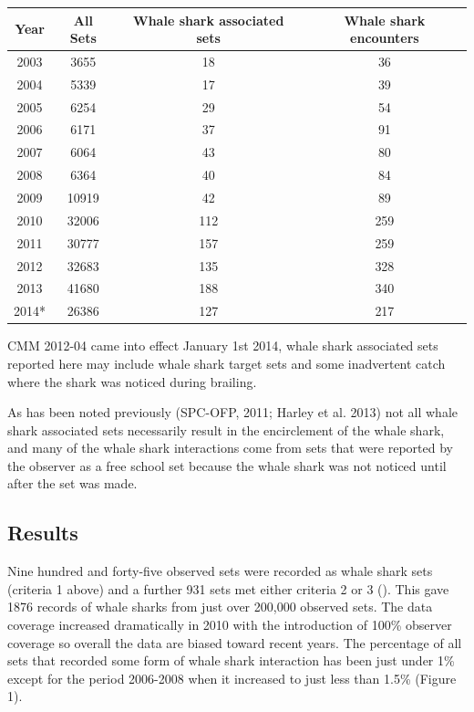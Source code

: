 \documentclass[12pt]{SCreport}
\begin{document}
\begin{table}[!h]
\label{tbl:whalesharktable1}
\begin{center}
\begin{tabular}{c|c|c|c}
Year & All Sets & Whale shark associated sets & Whale shark encounters\\
\hline
\hline
2003&	3655&	18&	36\\
2004&	5339&	17&	39\\
2005&	6254&	29&	54\\
2006&	6171&	37&	91\\
2007&	6064&	43&	80\\
2008&	6364&	40&	84\\
2009&	10919&	42&	89\\
2010&	32006&	112&	259\\
2011&	30777&	157&	259\\
2012&	32683&	135&	328\\
2013&	41680&	188&	340\\
2014*&	26386&	127&	217\\
\hline
\end{tabular}
\end{center}
\end{table}

CMM 2012-04 came into effect January 1st 2014, whale shark associated sets reported here may include whale shark target sets and some inadvertent catch where the shark was noticed during brailing.

As has been noted previously (SPC-OFP, 2011; Harley et al. 2013) not all whale shark associated sets necessarily result in the encirclement of the whale shark, and many of the whale shark interactions come from sets that were reported by the observer as a free school set because the whale shark was not noticed until after the set was made. 




\subsection{Results}
Nine hundred and forty-five observed sets were recorded as whale shark sets (criteria 1 above) and a further 931 sets met either criteria 2 or 3 (). This gave 1876 records of whale sharks from just over 200,000 observed sets. The data coverage increased dramatically in 2010 with the introduction of 100\% observer coverage so overall the data are biased toward recent years. The percentage of all sets that recorded some form of whale shark interaction has been just under 1\% except for the period 2006-2008 when it increased to just less than 1.5\% (Figure 1).
\end{document}
